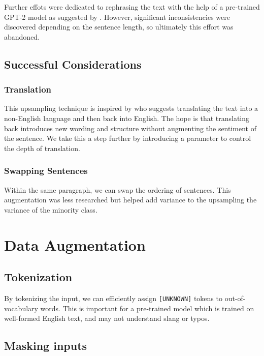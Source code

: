 \documentclass[11pt,a4paper]{article}
\begin{document}
Further effots were dedicated to rephrasing the text with the help of a pre-trained GPT-2 model as suggested by \citet{Dai2023AugGPTLC}. However, significant inconsistencies were discovered depending on the sentence length, so ultimately this effort was abandoned.

\subsection{Successful Considerations}

\subsubsection{Translation}

This upsampling technique is inspired by \citet{nlp-imbalanced-data} who suggests translating the text into a non-English language and then back into English. The hope is that translating back introduces new wording and structure without augmenting the sentiment of the sentence. We take this a step further by introducing a parameter to control the depth of translation.

\subsubsection{Swapping Sentences}

Within the same paragraph, we can swap the ordering of sentences. This augmentation was less researched but helped add variance to the upsampling the variance of the minority class.

\section{Data Augmentation}

\subsection{Tokenization}

By tokenizing the input, we can efficiently assign \texttt{[UNKNOWN]} tokens to out-of-vocabulary words. This is important for a pre-trained model which is trained on well-formed English text, and may not understand slang or typos.

\subsection{Masking inputs}
\end{document}

